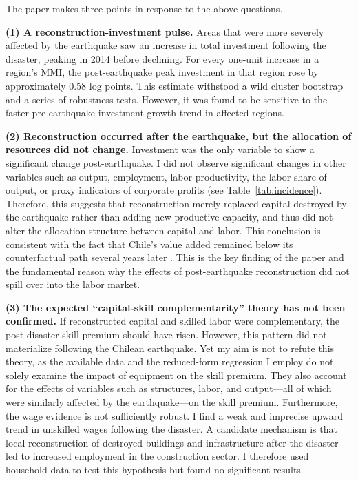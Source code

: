 \documentclass[12pt]{article}
\begin{document}
The paper makes three points in response to the above questions.

\textbf{(1) A reconstruction-investment pulse.} Areas that were more severely affected by the
earthquake saw an increase in total investment following the disaster, peaking in 2014 before
declining. For every one-unit increase in a region's MMI, the post-earthquake peak investment in
that region rose by approximately 0.58 log points. This estimate withstood a wild cluster
bootstrap and a series of robustness tests. However, it was found to be sensitive to the faster
pre-earthquake investment growth trend in affected regions.

\textbf{(2) Reconstruction occurred after the earthquake, but the allocation of resources did not
change.} Investment was the only variable to show a significant change post-earthquake. I did not
observe significant changes in other variables such as output, employment, labor productivity, the
labor share of output, or proxy indicators of corporate profits (see Table~\ref{tab:incidence}).
Therefore, this suggests that reconstruction merely replaced capital destroyed by the earthquake
rather than adding new productive capacity, and thus did not alter the allocation structure between
capital and labor. This conclusion is consistent with the fact that Chile's value added remained
below its counterfactual path several years later \citep{diaz2024}. This is the key finding of the
paper and the fundamental reason why the effects of post-earthquake reconstruction did not spill
over into the labor market.

\textbf{(3) The expected ``capital-skill complementarity'' theory has not been confirmed.} If
reconstructed capital and skilled labor were complementary, the post-disaster skill premium should
have risen. However, this pattern did not materialize following the Chilean earthquake. Yet my aim
is not to refute this theory, as the available data and the reduced-form regression I employ do not
solely examine the impact of equipment on the skill premium. They also account for the effects of
variables such as structures, labor, and output---all of which were similarly affected by the
earthquake---on the skill premium. Furthermore, the wage evidence is not sufficiently robust. I
find a weak and imprecise upward trend in unskilled wages following the disaster. A candidate
mechanism is that local reconstruction of destroyed buildings and infrastructure after the disaster
led to increased employment in the construction sector. I therefore used household data to test
this hypothesis but found no significant results.
\end{document}
